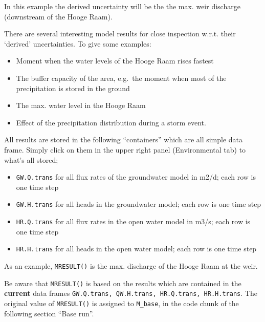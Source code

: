 \documentclass[
]{article}
\newenvironment{Shaded}{\begin{snugshade}}{\end{snugshade}}
\newcommand{\ControlFlowTok}[1]{\textcolor[rgb]{0.13,0.29,0.53}{\textbf{#1}}}
\newcommand{\FunctionTok}[1]{\textcolor[rgb]{0.13,0.29,0.53}{\textbf{#1}}}
\newcommand{\NormalTok}[1]{#1}
\newcommand{\OtherTok}[1]{\textcolor[rgb]{0.56,0.35,0.01}{#1}}
\newcommand{\SpecialCharTok}[1]{\textcolor[rgb]{0.81,0.36,0.00}{\textbf{#1}}}
\providecommand{\tightlist}{%
  \setlength{\itemsep}{0pt}\setlength{\parskip}{0pt}}
\begin{document}
In this example the derived uncertainty will be the the max. weir
discharge (downstream of the Hooge Raam).

There are several interesting model results for close inspection w.r.t.
their `derived' uncertainties. To give some examples:

\begin{itemize}
\tightlist
\item
  Moment when the water levels of the Hooge Raam rises fastest
\item
  The buffer capacity of the area, e.g.~the moment when most of the
  precipitation is stored in the ground
\item
  The max. water level in the Hooge Raam
\item
  Effect of the precipitation distribution during a storm event.
\end{itemize}

All results are stored in the following ``containers'' which are all
simple data frame. Simply click on them in the upper right panel
(Environmental tab) to what's all stored;

\begin{itemize}
\tightlist
\item
  \texttt{GW.Q.trans} for all flux rates of the groundwater model in
  m2/d; each row is one time step
\item
  \texttt{GW.H.trans} for all heads in the groundwater model; each row
  is one time step
\item
  \texttt{HR.Q.trans} for all flux rates in the open water model in
  m3/s; each row is one time step
\item
  \texttt{HR.H.trans} for all heads in the open water model; each row is
  one time step
\end{itemize}

As an example, \texttt{MRESULT()} is the max. discharge of the Hooge
Raam at the weir.

\begin{Shaded}
\end{Shaded}

Be aware that \texttt{MRESULT()} is based on the results which are
contained in the \textbf{current} data frames
\texttt{GW.Q.trans,\ QW.H.trans,\ HR.Q.trans,\ HR.H.trans}. The original
value of \texttt{MRESULT()} is assigned to \texttt{M\_base}, in the code
chunk of the following section ``Base run''.
\end{document}
